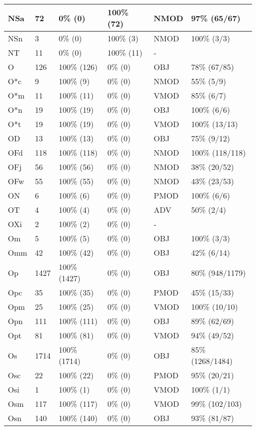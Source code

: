 \begin{figure*}
\begin{tabular}{|l|l|l|l||l|l|}
\hline
 NSa & 72 & 0\% (0) & 100\% (72) & NMOD & 97\% (65/67) \\ 
\hline
 NSn & 3 & 0\% (0) & 100\% (3) & NMOD & 100\% (3/3) \\ 
\hline
 NT & 11 & 0\% (0) & 100\% (11) & - &  \\ 
\hline
 O & 126 & 100\% (126) & 0\% (0) & OBJ & 78\% (67/85) \\ 
\hline
 O*c & 9 & 100\% (9) & 0\% (0) & NMOD & 55\% (5/9) \\ 
\hline
 O*m & 11 & 100\% (11) & 0\% (0) & VMOD & 85\% (6/7) \\ 
\hline
 O*n & 19 & 100\% (19) & 0\% (0) & OBJ & 100\% (6/6) \\ 
\hline
 O*t & 19 & 100\% (19) & 0\% (0) & VMOD & 100\% (13/13) \\ 
\hline
 OD & 13 & 100\% (13) & 0\% (0) & OBJ & 75\% (9/12) \\ 
\hline
 OFd & 118 & 100\% (118) & 0\% (0) & NMOD & 100\% (118/118) \\ 
\hline
 OFj & 56 & 100\% (56) & 0\% (0) & NMOD & 38\% (20/52) \\ 
\hline
 OFw & 55 & 100\% (55) & 0\% (0) & NMOD & 43\% (23/53) \\ 
\hline
 ON & 6 & 100\% (6) & 0\% (0) & PMOD & 100\% (6/6) \\ 
\hline
 OT & 4 & 100\% (4) & 0\% (0) & ADV & 50\% (2/4) \\ 
\hline
 OXi & 2 & 100\% (2) & 0\% (0) & - &  \\ 
\hline
 Om & 5 & 100\% (5) & 0\% (0) & OBJ & 100\% (3/3) \\ 
\hline
 Omm & 42 & 100\% (42) & 0\% (0) & OBJ & 42\% (6/14) \\ 
\hline
 Op & 1427 & 100\% (1427) & 0\% (0) & OBJ & 80\% (948/1179) \\ 
\hline
 Opc & 35 & 100\% (35) & 0\% (0) & PMOD & 45\% (15/33) \\ 
\hline
 Opm & 25 & 100\% (25) & 0\% (0) & VMOD & 100\% (10/10) \\ 
\hline
 Opn & 111 & 100\% (111) & 0\% (0) & OBJ & 89\% (62/69) \\ 
\hline
 Opt & 81 & 100\% (81) & 0\% (0) & VMOD & 94\% (49/52) \\ 
\hline
 Os & 1714 & 100\% (1714) & 0\% (0) & OBJ & 85\% (1268/1484) \\ 
\hline
 Osc & 22 & 100\% (22) & 0\% (0) & PMOD & 95\% (20/21) \\ 
\hline
 Osi & 1 & 100\% (1) & 0\% (0) & VMOD & 100\% (1/1) \\ 
\hline
 Osm & 117 & 100\% (117) & 0\% (0) & VMOD & 99\% (102/103) \\ 
\hline
 Osn & 140 & 100\% (140) & 0\% (0) & OBJ & 93\% (81/87) \\ 
\hline
\end{tabular}
\end{figure*}
